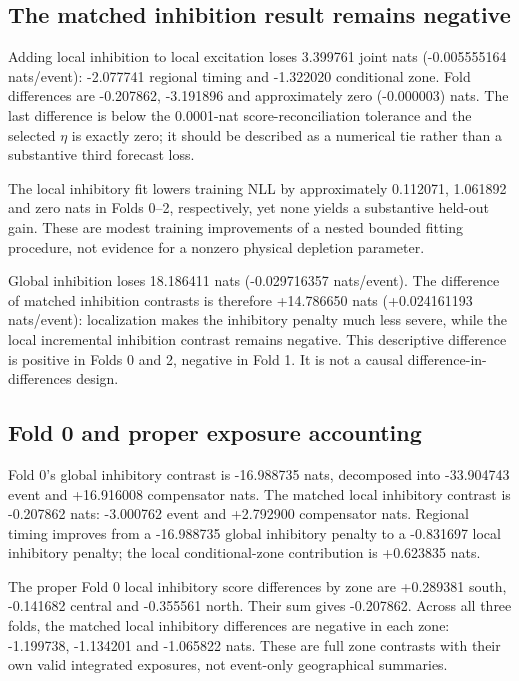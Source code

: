 \subsection{The matched inhibition result remains negative}

Adding local inhibition to local excitation loses 3.399761 joint nats (-0.005555164 nats/event): -2.077741 regional timing and -1.322020 conditional zone. Fold differences are -0.207862, -3.191896 and approximately zero (-0.000003) nats. The last difference is below the 0.0001-nat score-reconciliation tolerance and the selected $\eta$ is exactly zero; it should be described as a numerical tie rather than a substantive third forecast loss.

The local inhibitory fit lowers training NLL by approximately 0.112071, 1.061892 and zero nats in Folds 0--2, respectively, yet none yields a substantive held-out gain. These are modest training improvements of a nested bounded fitting procedure, not evidence for a nonzero physical depletion parameter.

Global inhibition loses 18.186411 nats (-0.029716357 nats/event). The difference of matched inhibition contrasts is therefore +14.786650 nats (+0.024161193 nats/event): localization makes the inhibitory penalty much less severe, while the local incremental inhibition contrast remains negative. This descriptive difference is positive in Folds 0 and 2, negative in Fold 1. It is not a causal difference-in-differences design.

\subsection{Fold 0 and proper exposure accounting}

Fold 0's global inhibitory contrast is -16.988735 nats, decomposed into -33.904743 event and +16.916008 compensator nats. The matched local inhibitory contrast is -0.207862 nats: -3.000762 event and +2.792900 compensator nats. Regional timing improves from a -16.988735 global inhibitory penalty to a -0.831697 local inhibitory penalty; the local conditional-zone contribution is +0.623835 nats.

The proper Fold 0 local inhibitory score differences by zone are +0.289381 south, -0.141682 central and -0.355561 north. Their sum gives -0.207862. Across all three folds, the matched local inhibitory differences are negative in each zone: -1.199738, -1.134201 and -1.065822 nats. These are full zone contrasts with their own valid integrated exposures, not event-only geographical summaries.

